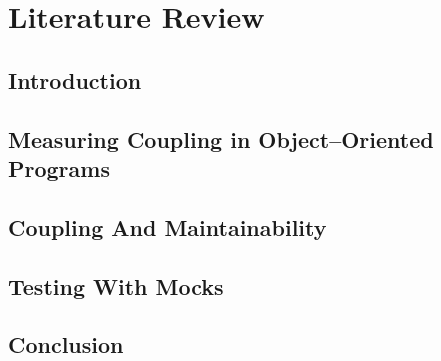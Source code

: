 \chapter{Literature Review}

\section{Introduction}

\section{Measuring Coupling in Object–Oriented Programs}

\section{Coupling And Maintainability}

\section{Testing With Mocks}

\section{Conclusion}